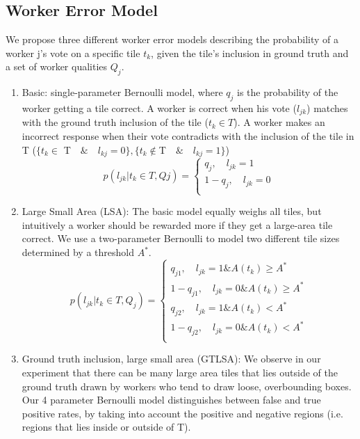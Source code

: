 {\subsection{Worker Error Model}
We propose three different worker error models describing the probability of a worker j's vote on a specific tile $t_k$, given the tile's inclusion in ground truth and a set of worker qualities $Q_j$. 
\begin{enumerate}
\item Basic: single-parameter Bernoulli model, where $q_j$ is the probability of the worker getting a tile correct. A worker is correct when his vote ($l_{jk}$) matches with the ground truth inclusion of the tile ($t_k\in T$). A worker makes an incorrect response when their vote contradicts with the inclusion of the tile in T ($\{t_k\in$ T$\quad\&\quad l_{kj}=0\}, \{t_k\notin $T$\quad\&\quad l_{kj}=1\}$)
\begin{equation}
p(l_{jk}|t_k\in T, Qj) = \begin{cases}
               q_j, \quad l_{jk}=1\\
               1-q_j, \quad l_{jk}=0\\
            \end{cases}
\end{equation}
\item Large Small Area (LSA): The basic model equally weighs all tiles, but intuitively a worker should be rewarded more if they get a large-area tile correct. We use a two-parameter Bernoulli to model two different tile sizes determined by a threshold $A^*$.
\begin{equation}
p(l_{jk}|t_k\in T,Q_j) = \begin{cases}
               q_{j1}, \quad l_{jk}=1 \& A(t_k)\geq A^*\\
               1-q_{j1}, \quad l_{jk}=0 \& A(t_k)\geq A^*\\
                q_{j2}, \quad l_{jk}=1 \& A(t_k)< A^*\\
               1-q_{j2}, \quad l_{jk}=0 \& A(t_k)< A^*\\
            \end{cases}
\end{equation}
\item Ground truth inclusion, large small area (GTLSA): We observe in our experiment that there can be many large area tiles that lies outside of the ground truth drawn by workers who tend to draw loose, overbounding boxes. Our 4 parameter Bernoulli model distinguishes between false and true positive rates, by taking into account the positive and negative regions (i.e. regions that lies inside or outside of T). 

\end{enumerate}}
